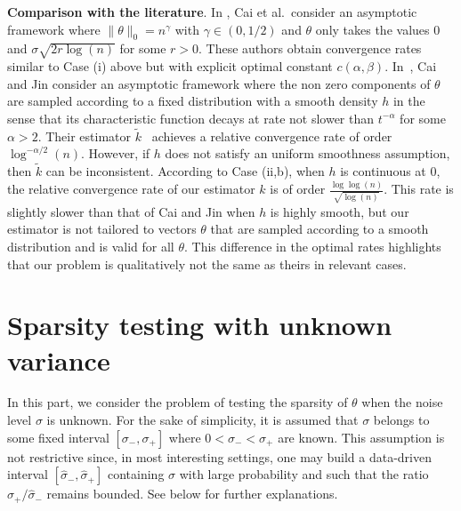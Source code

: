 \documentclass[twoside,11pt]{article}
\newcommand{\<}{\langle}
\renewcommand{\>}{\rangle}
\begin{document}
\noindent 
{\bf Comparison with the literature}. In \cite{MR2382653}, Cai et al.~consider an asymptotic framework where $\|\theta\|_0=n^{\gamma}$ with $\gamma\in (0,1/2)$ and $\theta$ only takes the values $0$ and $\sigma  \sqrt{2r\log(n)}$ for some $r>0$. These authors obtain convergence rates similar to Case (i) above but with explicit optimal constant $c(\alpha,\beta)$. In~\cite{MR2589318}, Cai and Jin consider an asymptotic framework where the non zero components of $\theta$  are sampled according to a fixed distribution with a smooth density $h$ in the sense that its characteristic function decays at rate not slower than $t^{-\alpha}$ for some $\alpha>2$. Their estimator $\widetilde{k}$~\cite[Sect.~3.1]{MR2589318} achieves a relative convergence rate of order $\log^{-\alpha/2}(n)$. However, if $h$ does not satisfy an uniform smoothness assumption, then $\widetilde{k}$ can be inconsistent. According to Case (ii,b), when $h$ is continuous at $0$, the relative convergence rate of our estimator $\widehat{k}$ is of order $\frac{\log\log(n)}{\sqrt{\log(n)}}$. This rate is slightly slower than that of Cai and Jin when $h$ is highly smooth, but our estimator is not tailored
to vectors $\theta$ that are sampled according to a smooth distribution and is valid for all $\theta$. This difference in the optimal rates highlights that our problem is qualitatively not the same as theirs in relevant cases.













\section{Sparsity testing with unknown variance}\label{sec:testUV}


In this part, we consider the problem of testing the sparsity of $\theta$ when the noise level $\sigma$ is unknown. For the sake of simplicity, it is assumed that $\sigma$ belongs to some fixed interval $[\sigma_-, \sigma_+]$ where $0< \sigma_-<\sigma_+$ are known. This assumption is not restrictive since, in most interesting settings, one may build a data-driven interval $[\widehat{\sigma}_-, \widehat{\sigma}_+]$ containing $\sigma$ with large probability and such that the ratio $\widehat{\sigma}_+/\widehat{\sigma}_{-}$ remains bounded. See below for further explanations. 
\end{document}
